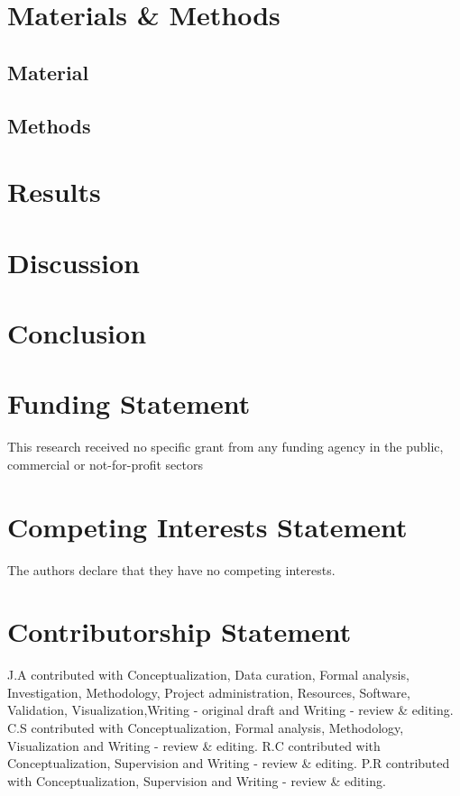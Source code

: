 \documentclass[]{article}
\begin{document}
\section{Materials \& Methods}
\subsection{Material}


\subsection{Methods}


\section{Results}


\section{Discussion}


\section{Conclusion}





\section*{Funding Statement}
This research received no specific grant from any funding agency in the public, commercial or not-for-profit sectors

\section*{Competing Interests Statement}
The authors declare that they have no competing interests.


\section*{Contributorship Statement}
J.A contributed with Conceptualization, Data curation, Formal analysis, Investigation, Methodology, Project administration, Resources, Software, Validation, Visualization,Writing - original draft and Writing - review \& editing.
C.S contributed with Conceptualization, Formal analysis, Methodology, Visualization and Writing - review \& editing.
R.C contributed with Conceptualization, Supervision and Writing - review \& editing.
P.R contributed with Conceptualization, Supervision and Writing - review \& editing.
\end{document}
